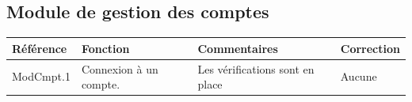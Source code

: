 \documentclass[10pt,a4paper,landscape]{report}
\begin{document}
\subsection{Module de gestion des comptes}

\begin{center}
	\bgroup
	\def\arraystretch{1.5}
	\begin{tabular}{|p{2.5cm}|p{8cm}|p{8cm}|p{8cm}|}
		\hline
		\rowcolor{gris}Référence & Fonction & Commentaires & Correction\\
		\hline
		ModCmpt.1 & Connexion à un compte. & Les vérifications sont en place & Aucune \\
		\hline
	\end{tabular}
	\egroup
\end{center}
\end{document}
